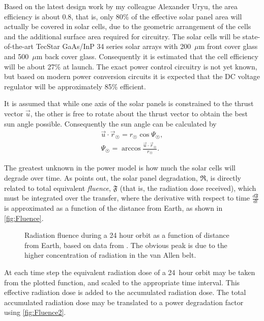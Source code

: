 Based on the latest design work by my colleague Alexander Uryu, the area efficiency is about 0.8, that is, only 80\% of the effective solar panel area will actually be covered in solar cells, due to the geometric arrangement of the cells and the additional surface area required for circuitry. The solar cells will be state-of-the-art TecStar GaAs/InP 34 series solar arrays with 200~$\mu$m front cover glass and 500~$\mu$m back cover glass. Consequently it is estimated that the cell efficiency will be about 27\% at launch. The exact power control circuitry is not yet known, but based on modern power conversion circuits it is expected that the DC voltage regulator will be approximately 85\% efficient. 

It is assumed that while one axis of the solar panels is constrained to the thrust vector $\vec{u}$, the other is free to rotate about the thrust vector to obtain the best sun angle possible. Consequently the sun angle can be calculated by
\begin{subequations}
\begin{gather} \label{eq:sun-angle}
\vec{u}\cdot\vec{r}_\Sun = r_\Sun\cos\Psi_\Sun, \\
\Psi_\Sun = \arccos\frac{\vec{u}\cdot\vec{r}_\Sun}{r_\Sun}.
\end{gather}
\end{subequations}

The greatest unknown in the power model is how much the solar cells will degrade over time. As \textcite{Erb_thesis} points out, the solar panel degradation, $\mathfrak{R}$, is directly related to total equivalent \emph{fluence}, $\mathfrak{F}$ (that is, the radiation dose received), which must be integrated over the transfer, where the derivative with respect to time $\frac{d\mathfrak{F}}{dt}$ is approximated as a function of the distance from Earth, as shown in \autoref{fig:Fluence}. 

\begin{figure}
\centering
\def\svgwidth{\figurewidth}

\caption{Radiation fluence during a 24 hour orbit as a function of distance from Earth, based on data from \textcite{Erb_thesis}. The obvious peak is due to the higher concentration of radiation in the van Allen belt.} \label{fig:Fluence}
\end{figure}
  
At each time step the equivalent radiation dose of a 24~hour orbit may be taken from the plotted function, and scaled to the appropriate time interval. This effective radiation dose is added to the accumulated radiation dose. The total accumulated radiation dose may be translated to a power degradation factor using \autoref{fig:Fluence2}.

